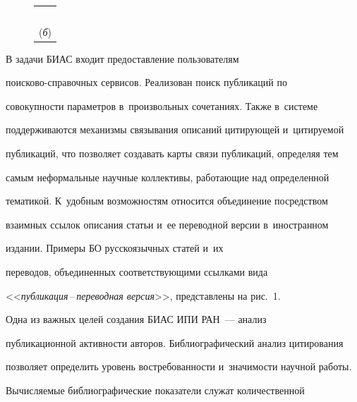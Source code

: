 \begin{figure}[b]
\begin{center}
{\begin{tabular}{|c|c|c|c|}
\hline


  \multicolumn{4}{c}{\ }\\[-4pt]


  \multicolumn{4}{c}{(\textit{б})}


  \end{tabular}}


  \end{center}


  \vspace*{-11pt}




  \end{figure}





  В задачи БИАС входит предоставление пользователям


  по\-иско\-во-спра\-воч\-ных сервисов. Реализован поиск публикаций по


совокупности параметров в~произвольных сочетаниях. Также в~системе


поддерживаются механизмы связывания описаний цитирующей и~цитируемой


публикаций, что позволяет создавать карты связи публикаций, определяя тем


самым неформальные научные коллективы, работающие над определенной


тематикой. К~удобным возможностям относится объединение посредством


взаимных ссылок описания статьи и~ее переводной версии в~иностранном


издании. Примеры БО русскоязычных статей и~их


переводов, объединенных соответствующими ссылками вида


<<\textit{публикация}\,--\,\textit{переводная версия}>>, представлены на рис.~1.











  Одна из важных целей создания БИАС ИПИ РАН~--- анализ


публикационной активности авторов. Библиографический анализ цитирования


позволяет определить уровень востребованности и~значимости научной работы.


Вычисляемые библиографические показатели служат количественной


